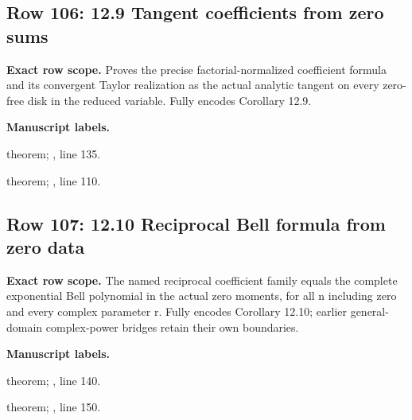 \subsection{Row 106: 12.9 Tangent coefficients from zero sums}
\label{row:106}
\textbf{Exact row scope.} Proves the precise factorial-normalized coefficient formula and its convergent Taylor realization as the actual analytic tangent on every zero-free disk in the reduced variable. Fully encodes Corollary 12.9.\par\smallskip
\textbf{Manuscript labels.} \par\smallskip
{\small{}\par}
{\footnotesize\color{muted}theorem; , line 135.\par}\smallskip
{\small{}\par}
{\footnotesize\color{muted}theorem; , line 110.\par}\smallskip
{}
\subsection{Row 107: 12.10 Reciprocal Bell formula from zero data}
\label{row:107}
\textbf{Exact row scope.} The named reciprocal coefficient family equals the complete exponential Bell polynomial in the actual zero moments, for all n including zero and every complex parameter r. Fully encodes Corollary 12.10; earlier general-domain complex-power bridges retain their own boundaries.\par\smallskip
\textbf{Manuscript labels.} \par\smallskip
{\small{}\par}
{\footnotesize\color{muted}theorem; , line 140.\par}\smallskip
{\small{}\par}
{\footnotesize\color{muted}theorem; , line 150.\par}\smallskip
{}
